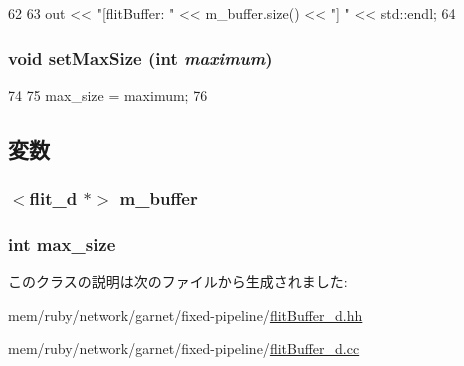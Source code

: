 \begin{DoxyCode}
62 {
63     out << "[flitBuffer: " << m_buffer.size() << "] " << std::endl;
64 }
\end{DoxyCode}
\hypertarget{classflitBuffer__d_ac58f3102de0ff8d654c9dbdf86c82b2a}{
\subsubsection[{setMaxSize}]{\setlength{\rightskip}{0pt plus 5cm}void setMaxSize (int {\em maximum})}}
\label{classflitBuffer__d_ac58f3102de0ff8d654c9dbdf86c82b2a}



\begin{DoxyCode}
74 {
75     max_size = maximum;
76 }
\end{DoxyCode}


\subsection{変数}
\hypertarget{classflitBuffer__d_a3c68626af928c9b911d8912770606f2e}{
\subsubsection[{m\_\-buffer}]{$<${\bf flit\_\-d} $\ast$$>$ {\bf m\_\-buffer}}}
\label{classflitBuffer__d_a3c68626af928c9b911d8912770606f2e}
\hypertarget{classflitBuffer__d_a98ca8117bc73d9d7520727c4ce8772e6}{
\subsubsection[{max\_\-size}]{\setlength{\rightskip}{0pt plus 5cm}int {\bf max\_\-size}}}
\label{classflitBuffer__d_a98ca8117bc73d9d7520727c4ce8772e6}


このクラスの説明は次のファイルから生成されました:\begin{DoxyCompactItemize}
\item 
mem/ruby/network/garnet/fixed-\/pipeline/\hyperlink{flitBuffer__d_8hh}{flitBuffer\_\-d.hh}\item 
mem/ruby/network/garnet/fixed-\/pipeline/\hyperlink{flitBuffer__d_8cc}{flitBuffer\_\-d.cc}\end{DoxyCompactItemize}
